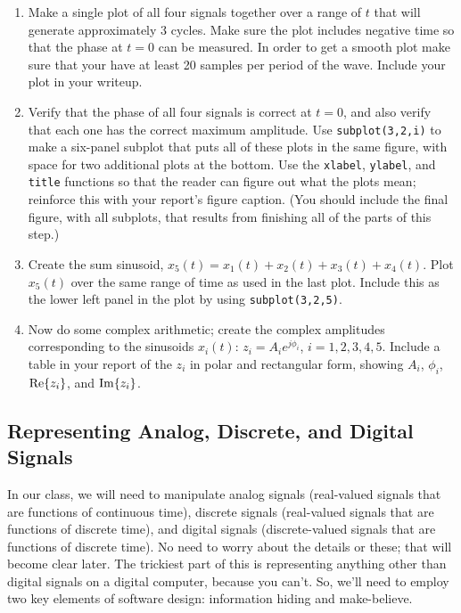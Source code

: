 \begin{enumerate}\renewcommand{\theenumi}{\alph{enumi}}
\item Make a single plot of all four signals together over a range of
  $t$ that will generate approximately 3 cycles. Make sure the plot
  includes negative time so that the phase at $t = 0$ can be
  measured. In order to get a smooth plot make sure that your have at
  least 20 samples per period of the wave. Include your plot in your
  writeup.

\item Verify that the phase of all four signals is correct at $t = 0$,
  and also verify that each one has the correct maximum amplitude. Use
  \verb|subplot(3,2,i)| to make a six-panel subplot that puts all of
  these plots in the same figure, with space for two additional plots
  at the bottom. Use the \verb|xlabel|, \verb|ylabel|, and
  \verb|title| functions so that the reader can figure out what the
  plots mean; reinforce this with your report's figure caption. (You
  should include the final figure, with all subplots, that results
  from finishing all of the parts of this step.)

\item Create the sum sinusoid,
  $x_5(t)=x_1(t)+x_2(t)+x_3(t)+x_4(t)$. Plot $x_5(t)$ over the same
  range of time as used in the last plot. Include this as the lower
  left panel in the plot by using \verb|subplot(3,2,5)|.

\item Now do some complex arithmetic; create the complex amplitudes
  corresponding to the sinusoids $x_i(t)$: $z_i = A_ie^{j\phi_i}$,
  $i=1,2,3,4,5$. Include a table in your report of the $z_i$ in polar
  and rectangular form, showing $A_i$, $\phi_i$, $\operatorname{Re}\{z_i\}$, and
  $\operatorname{Im}\{z_i\}$.
\end{enumerate}


\subsection{Representing Analog, Discrete, and Digital Signals}

In our class, we will need to manipulate analog signals (real-valued
signals that are functions of continuous time), discrete signals
(real-valued signals that are functions of discrete time), and digital
signals (discrete-valued signals that are functions of discrete
time). No need to worry about the details or these; that will become
clear later. The trickiest part of this is representing anything other
than digital signals on a digital computer, because you can't. So,
we'll need to employ two key elements of software design: information
hiding and make-believe.

